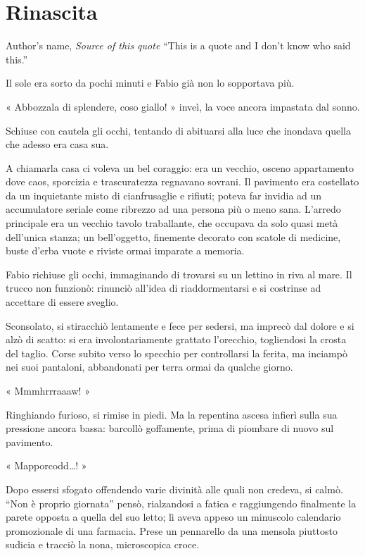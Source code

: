 \chapter{Rinascita}

\begin{chapquote}{Author's name, \textit{Source of this quote}}
``This is a quote and I don't know who said this.''
\end{chapquote}


Il sole era sorto da pochi minuti e Fabio già non lo sopportava più.

« Abbozzala  di splendere, coso giallo! » inveì, la voce ancora impastata dal sonno.

Schiuse con cautela gli occhi, tentando di abituarsi alla luce che inondava quella che adesso era casa sua.

A chiamarla casa ci voleva un bel coraggio: era un vecchio, osceno appartamento dove caos, sporcizia e trascuratezza regnavano sovrani. Il pavimento era costellato da un inquietante misto di cianfrusaglie e rifiuti; poteva far invidia ad un accumulatore seriale come ribrezzo ad una persona più o meno sana. L'arredo principale era un vecchio tavolo traballante, che occupava da solo quasi metà dell'unica stanza; un bell'oggetto, finemente decorato con scatole di medicine, buste d'erba vuote e riviste ormai imparate a memoria.

Fabio richiuse gli occhi, immaginando di trovarsi su un lettino in riva al mare. Il trucco non funzionò: rinunciò all'idea di riaddormentarsi e si costrinse ad accettare di essere sveglio.

Sconsolato, si stiracchiò lentamente e fece per sedersi, ma imprecò dal dolore e si alzò di scatto: si era involontariamente grattato l'orecchio, togliendosi la crosta del taglio. Corse subito verso lo specchio per controllarsi la ferita, ma inciampò nei suoi pantaloni, abbandonati per terra ormai da qualche giorno.

« Mmmhrrraaaw! »

Ringhiando furioso, si rimise in piedi. Ma la repentina ascesa infierì sulla sua pressione ancora bassa: barcollò goffamente, prima di piombare di nuovo sul pavimento.

« Mapporcodd\ldots! »

Dopo essersi sfogato offendendo varie divinità alle quali non credeva, si calmò. ``Non è proprio giornata'' pensò, rialzandosi a fatica e raggiungendo finalmente la parete opposta a quella del suo letto; lì aveva appeso un minuscolo calendario promozionale di una farmacia. Prese un pennarello da una mensola piuttosto sudicia e tracciò la nona, microscopica croce.

